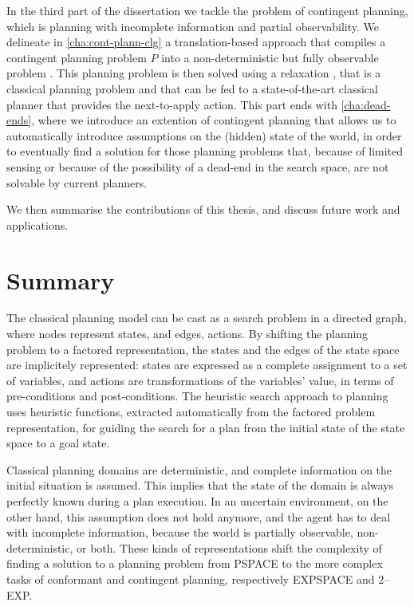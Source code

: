 In the third part of the dissertation we tackle the problem of contingent planning, which is planning with incomplete information and partial observability.
We delineate in \autoref{cha:cont-plann-clg} a translation-based approach that compiles a contingent planning problem $P$
into a non-deterministic but fully observable problem \XP. This planning problem is then solved using a relaxation \HP, that is a classical planning problem and that can be fed to a state-of-the-art classical planner that provides the next-to-apply action.
This part ends with \autoref{cha:dead-ends}, where we introduce an extention of contingent planning that allows us to automatically introduce assumptions on
the (hidden) state of the world, in order to eventually find a solution for those planning problems that, because of limited sensing or 
because of the possibility of a dead-end in the search space, are not solvable by current planners.

We then summarise the contributions of this thesis, and discuss future work and applications.

\section{Summary}
The classical planning model 
can be cast as a search problem in a directed graph, where nodes represent states, and edges, actions.
By shifting the planning problem to a factored representation, the states and the edges of the state space 
are implicitely represented: states are expressed as a complete assignment to a set of variables, and actions
are transformations of the variables' value, in terms of pre-conditions and post-conditions. %
The heuristic search approach to planning uses heuristic functions, extracted automatically from the factored problem
representation, for guiding the search for a plan from the initial state of the state space to a goal state.

Classical planning domains are deterministic, and complete information on the initial situation is assumed. This implies that
the state of the domain is always perfectly known during a plan execution.
In an uncertain environment, on the other hand, this assumption does not hold anymore, and the
agent has to deal with incomplete information, because the world is partially observable, non-deterministic, or both.
These kinds of representations shift the complexity of finding a solution to a planning problem from PSPACE to the more complex tasks
of conformant and contingent planning, respectively EXPSPACE and 2--EXP.





